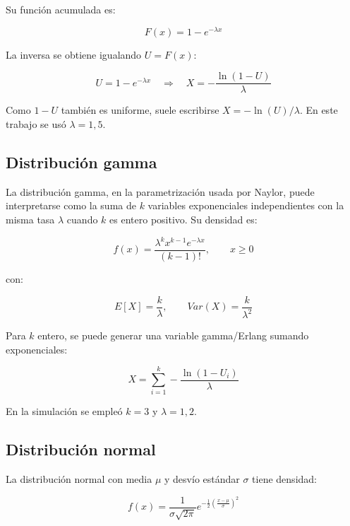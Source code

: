 \documentclass{article}
\begin{document}
Su función acumulada es:

\begin{equation}
    F(x)=1-e^{-\lambda x}
\end{equation}

La inversa se obtiene igualando $U=F(x)$:

\begin{equation}
    U = 1-e^{-\lambda x}
    \quad \Rightarrow \quad
    X = -\frac{\ln(1-U)}{\lambda}
\end{equation}

Como $1-U$ también es uniforme, suele escribirse $X=-\ln(U)/\lambda$. En este
trabajo se usó $\lambda=1{,}5$.

\subsection{Distribución gamma}

La distribución gamma, en la parametrización usada por Naylor, puede
interpretarse como la suma de $k$ variables exponenciales independientes con la
misma tasa $\lambda$ cuando $k$ es entero positivo. Su densidad es:

\begin{equation}
    f(x)=\frac{\lambda^k x^{k-1}e^{-\lambda x}}{(k-1)!}, \qquad x \geq 0
\end{equation}

\noindent con:

\begin{equation}
    E[X]=\frac{k}{\lambda}, \qquad Var(X)=\frac{k}{\lambda^2}
\end{equation}

Para $k$ entero, se puede generar una variable gamma/Erlang sumando
exponenciales:

\begin{equation}
    X = \sum_{i=1}^{k} -\frac{\ln(1-U_i)}{\lambda}
\end{equation}

En la simulación se empleó $k=3$ y $\lambda=1{,}2$.

\subsection{Distribución normal}

La distribución normal con media $\mu$ y desvío estándar $\sigma$ tiene densidad:

\begin{equation}
    f(x)=\frac{1}{\sigma\sqrt{2\pi}}
    e^{-\frac{1}{2}\left(\frac{x-\mu}{\sigma}\right)^2}
\end{equation}
\end{document}
